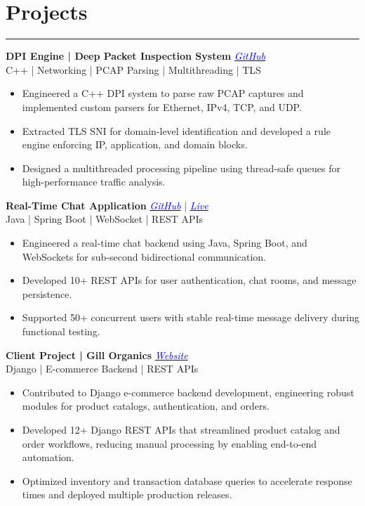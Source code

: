 \documentclass[11pt,a4paper]{article}
\newcommand{\sectionline}{\vspace{-4pt}\hrule\vspace{4pt}}
\newcommand{\blockspace}{\vspace{2pt}}
\newcommand{\projectlink}[2]{\href{#1}{\textcolor{blue}{\textit{#2}}}}
\newcommand{\projecttitle}[1]{{\fontsize{12}{13}\selectfont\textbf{#1}}}
\newcommand{\projectdescspace}{\vspace{0pt}}
\newcommand{\projectstack}[1]{{\footnotesize #1}}
\begin{document}
\blockspace

\section*{Projects}
\sectionline
\projecttitle{DPI Engine \;|\; Deep Packet Inspection System} \hfill \projectlink{https://github.com/arifashraf01/Packet_analyzer}{GitHub} \\
\projectstack{C++ | Networking | PCAP Parsing | Multithreading | TLS}
\projectdescspace
\normalsize
\begin{itemize}
	\item Engineered a C++ DPI system to parse raw PCAP captures and implemented custom parsers for Ethernet, IPv4, TCP, and UDP.
	\item Extracted TLS SNI for domain-level identification and developed a rule engine enforcing IP, application, and domain blocks.
	\item Designed a multithreaded processing pipeline using thread-safe queues for high-performance traffic analysis.
\end{itemize}

\blockspace

\projecttitle{Real-Time Chat Application} \hfill \projectlink{https://github.com/arifashraf01/ephemeral-chat-system}{GitHub} \;|\; \projectlink{https://chatapp.stacksense.in}{Live} \\
\projectstack{Java | Spring Boot | WebSocket | REST APIs}
\projectdescspace
\normalsize
\begin{itemize}
	\item Engineered a real-time chat backend using Java, Spring Boot, and WebSockets for sub-second bidirectional communication.
	\item Developed 10+ REST APIs for user authentication, chat rooms, and message persistence.
	\item Supported 50+ concurrent users with stable real-time message delivery during functional testing.
\end{itemize}

\blockspace

\projecttitle{Client Project \;|\; Gill Organics} \hfill \projectlink{https://gillorganics.com}{Website} \\
\projectstack{Django | E-commerce Backend | REST APIs}
\projectdescspace
\normalsize
\begin{itemize}
	\item Contributed to Django e-commerce backend development, engineering robust modules for product catalogs, authentication, and orders.
	\item Developed 12+ Django REST APIs that streamlined product catalog and order workflows, reducing manual processing by enabling end-to-end automation.
	\item Optimized inventory and transaction database queries to accelerate response times and deployed multiple production releases.
\end{itemize}
\end{document}

